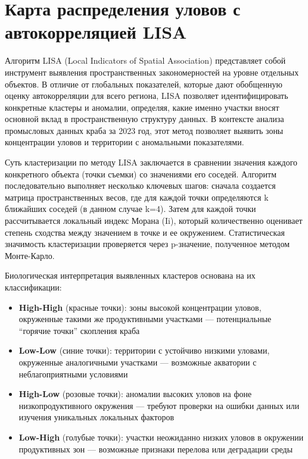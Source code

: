 \documentclass[
  letterpaper,
  DIV=11,
  numbers=noendperiod]{scrreprt}
\begin{document}
\section{Карта распределения уловов с автокорреляцией
LISA}\label{ux43aux430ux440ux442ux430-ux440ux430ux441ux43fux440ux435ux434ux435ux43bux435ux43dux438ux44f-ux443ux43bux43eux432ux43eux432-ux441-ux430ux432ux442ux43eux43aux43eux440ux440ux435ux43bux44fux446ux438ux435ux439-lisa}

Алгоритм LISA (Local Indicators of Spatial Association) представляет
собой инструмент выявления пространственных закономерностей на уровне
отдельных объектов. В отличие от глобальных показателей, которые дают
обобщенную оценку автокорреляции для всего региона, LISA позволяет
идентифицировать конкретные кластеры и аномалии, определяя, какие именно
участки вносят основной вклад в пространственную структуру данных. В
контексте анализа промысловых данных краба за 2023 год, этот метод
позволяет выявить зоны концентрации уловов и территории с аномальными
показателями.

Суть кластеризации по методу LISA заключается в сравнении значения
каждого конкретного объекта (точки съемки) со значениями его соседей.
Алгоритм последовательно выполняет несколько ключевых шагов: сначала
создается матрица пространственных весов, где для каждой точки
определяются k ближайших соседей (в данном случае k=4). Затем для каждой
точки рассчитывается локальный индекс Морана (Ii), который количественно
оценивает степень сходства между значением в точке и ее окружением.
Статистическая значимость кластеризации проверяется через p-значение,
полученное методом Монте-Карло.

Биологическая интерпретация выявленных кластеров основана на их
классификации:

\begin{itemize}
\item
  \textbf{High-High} (красные точки): зоны высокой концентрации уловов,
  окруженные такими же продуктивными участками --- потенциальные
  ``горячие точки'' скопления краба
\item
  \textbf{Low-Low} (синие точки): территории с устойчиво низкими
  уловами, окруженные аналогичными участками --- возможные акватории с
  неблагоприятными условиями
\item
  \textbf{High-Low} (розовые точки): аномалии высоких уловов на фоне
  низкопродуктивного окружения --- требуют проверки на ошибки данных или
  изучения уникальных локальных факторов
\item
  \textbf{Low-High} (голубые точки): участки неожиданно низких уловов в
  окружении продуктивных зон --- возможные признаки перелова или
  деградации среды
\end{itemize}
\end{document}
